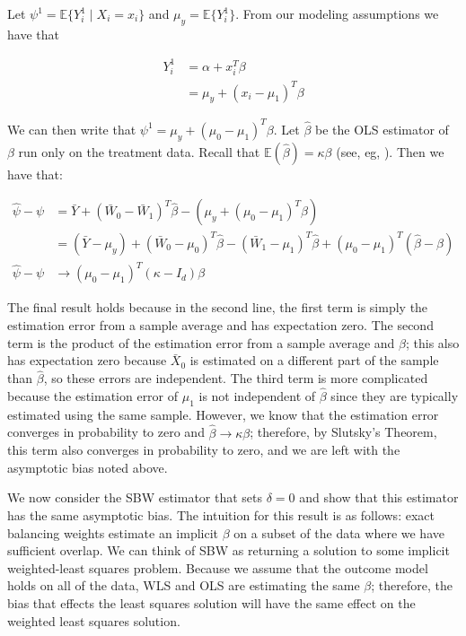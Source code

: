 \documentclass[12pt]{article}
\begin{document}
Let $\psi^1 = \mathbb{E}\{Y_i^1 \mid X_i = x_i\}$ and $\mu_y = \mathbb{E}\{Y_i^1\}$. From our modeling assumptions we have that

\begin{align*}
    Y_i^1 &= \alpha + x_i^T\beta \\
    &= \mu_y + (x_i - \mu_1)^T\beta
\end{align*}

We can then write that $\psi^1 = \mu_y + (\mu_0 - \mu_1)^T\beta$. Let $\hat{\beta}$ be the OLS estimator of $\beta$ run only on the treatment data. Recall that $\mathbb{E}(\hat{\beta}) = \kappa\beta$ (see, eg, \cite{gleser1992importance}). Then we have that: 

\begin{align*}
    \hat{\psi} - \psi &= \bar{Y} + (\bar{W}_0 - \bar{W}_1)^T\hat{\beta} - (\mu_y + (\mu_0 - \mu_1)^T\beta) \\
    &= (\bar{Y} - \mu_y) + (\bar{W}_0 - \mu_0)^T\hat{\beta} - (\bar{W}_1 - \mu_1)^T\hat{\beta} + (\mu_0 - \mu_1)^T(\hat{\beta} - \beta) \\
    \hat{\psi} - \psi &\to (\mu_0 - \mu_1)^T(\kappa - I_d)\beta
\end{align*}

The final result holds because in the second line, the first term is simply the estimation error from a sample average and has expectation zero. The second term is the product of the estimation error from a sample average and $\hat{\beta}$; this also has expectation zero because $\bar{X}_0$ is estimated on a different part of the sample than $\hat{\beta}$, so these errors are independent. The third term is more complicated because the estimation error of $\mu_1$ is not independent of $\hat{\beta}$ since they are typically estimated using the same sample. However, we know that the estimation error converges in probability to zero and $\hat{\beta} \to \kappa\beta$; therefore, by Slutsky's Theorem, this term also converges in probability to zero, and we are left with the asymptotic bias noted above. 

We now consider the SBW estimator that sets $\delta = 0$ and show that this estimator has the same asymptotic bias. The intuition for this result is as follows: exact balancing weights estimate an implicit $\beta$ on a subset of the data where we have sufficient overlap. We can think of SBW as returning a solution to some implicit weighted-least squares problem. Because we assume that the outcome model holds on all of the data, WLS and OLS are estimating the same $\beta$; therefore, the bias that effects the least squares solution will have the same effect on the weighted least squares solution.
\end{document}
